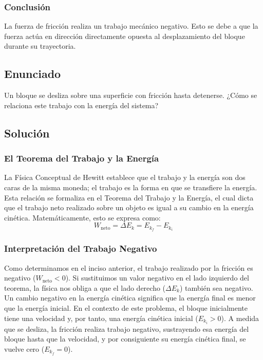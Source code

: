 \documentclass[a4paper,12pt]{article}
\begin{document}
\subsubsection*{Conclusión}
La fuerza de fricción realiza un trabajo mecánico negativo. Esto se debe a que la fuerza actúa en dirección directamente opuesta al desplazamiento del bloque durante su trayectoria.

\newpage
\subsection*{Enunciado}
Un bloque se desliza sobre una superficie con fricción hasta detenerse.
¿Cómo se relaciona este trabajo con la energía del sistema?

\subsection*{Solución}

\subsubsection*{El Teorema del Trabajo y la Energía}
La Física Conceptual de Hewitt establece que el trabajo y la energía son dos caras de la misma moneda; el trabajo es la forma en que se transfiere la energía. Esta relación se formaliza en el Teorema del Trabajo y la Energía, el cual dicta que el trabajo neto realizado sobre un objeto es igual a su cambio en la energía cinética. 
Matemáticamente, esto se expresa como:
$$W_{\text{neto}} = \Delta E_k = E_{k_f} - E_{k_i}$$

\subsubsection*{Interpretación del Trabajo Negativo}
Como determinamos en el inciso anterior, el trabajo realizado por la fricción es negativo ($W_{\text{neto}} < 0$). Si sustituimos un valor negativo en el lado izquierdo del teorema, la física nos obliga a que el lado derecho ($\Delta E_k$) también sea negativo. 
Un cambio negativo en la energía cinética significa que la energía final es menor que la energía inicial. En el contexto de este problema, el bloque inicialmente tiene una velocidad y, por tanto, una energía cinética inicial ($E_{k_i} > 0$). A medida que se desliza, la fricción realiza trabajo negativo, sustrayendo esa energía del bloque hasta que la velocidad, y por consiguiente su energía cinética final, se vuelve cero ($E_{k_f} = 0$).
\end{document}

